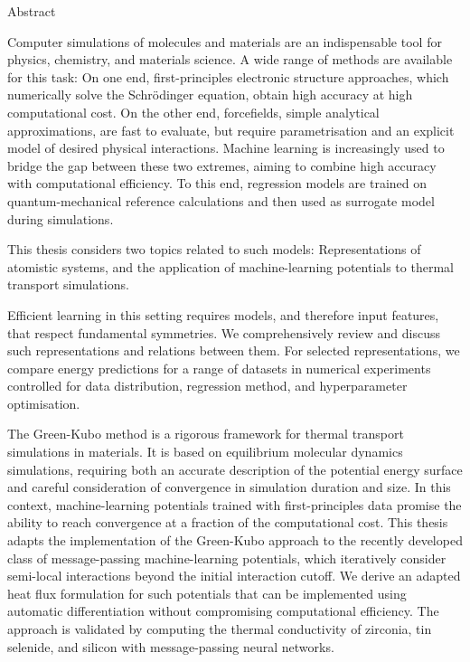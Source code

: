 
\cleardoublepage
\thispagestyle{plain}


{\normalfont\Large\noindent Abstract}
\vspace{\baselineskip}

\noindent
Computer simulations of molecules and materials are an indispensable tool for physics, chemistry, and materials science. A wide range of methods are available for this task: On one end, first-principles electronic structure approaches, which numerically solve the Schrödinger equation, obtain high accuracy at high computational cost. On the other end, forcefields, simple analytical approximations, are fast to evaluate, but require parametrisation and an explicit model of desired physical interactions.
Machine learning is increasingly used to bridge the gap between these two extremes, aiming to combine high accuracy with computational efficiency. To this end, regression models are trained on quantum-mechanical reference calculations and then used as surrogate model during simulations.

This thesis considers two topics related to such models: Representations of atomistic systems, and the application of machine-learning potentials to thermal transport simulations.

Efficient learning in this setting requires models, and therefore input features, that respect fundamental symmetries.
We comprehensively review and discuss such representations and relations between them.
For selected representations, we compare energy predictions for a range of datasets in numerical experiments controlled for data distribution, regression method, and hyperparameter optimisation.

The Green-Kubo method is a rigorous framework for thermal transport simulations in materials.
It is based on equilibrium molecular dynamics simulations, requiring both an accurate description of the potential energy surface and careful consideration of convergence in simulation duration and size.
In this context, machine-learning potentials trained with first-principles data promise the ability to reach convergence at a fraction of the computational cost.
This thesis adapts the implementation of the Green-Kubo approach to the recently developed class of message-passing machine-learning potentials, which iteratively consider semi-local interactions beyond the initial interaction cutoff. 
We derive an adapted heat flux formulation for such potentials that can be implemented using automatic differentiation without compromising computational efficiency.
The approach is validated by computing the thermal conductivity of zirconia, tin selenide, and silicon with message-passing neural networks.


